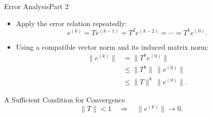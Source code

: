 \documentclass[10pt]{beamer}
\begin{document}
\begin{frame}{Error Analysis}{Part 2}

\begin{itemize}
    \item Apply the error relation repeatedly:
    \[
        e^{(k)}
        =Te^{(k-1)}
        =T^2e^{(k-2)}
        =\cdots=T^ke^{(0)}.
    \]

    \item Using a compatible vector norm and
    its induced matrix norm:
    \begin{align*}
        \|e^{(k)}\|
        &=\|T^ke^{(0)}\|\\
        &\le \|T^k\|\,\|e^{(0)}\|\\
        &\le \|T\|^k\,\|e^{(0)}\|.
    \end{align*}
\end{itemize}

\begin{block}{A Sufficient Condition for Convergence}
\[
    \|T\|<1
    \quad\Longrightarrow\quad
    \|e^{(k)}\|\longrightarrow0.
\]
\end{block}

\end{frame}
\end{document}
